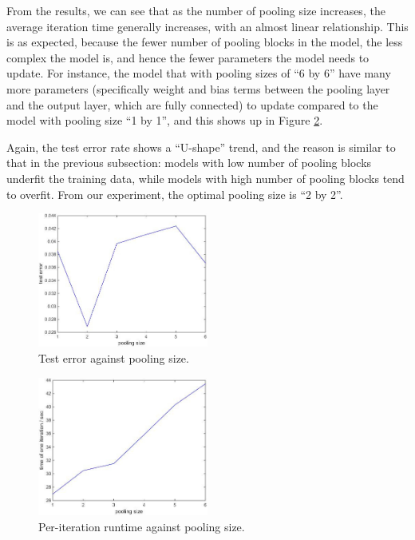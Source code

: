 \documentclass[10pt,twocolumn]{article}
\begin{document}
From the results, we can see that as the number of pooling size increases, the average iteration time generally increases, with an almost linear relationship. This is as expected, because the fewer number of pooling blocks in the model, the less complex the model is, and hence the fewer parameters the model needs to update. For instance, the model that with pooling sizes of ``6 by 6'' have many more parameters (specifically weight and bias terms between the pooling layer and the output layer, which are fully connected) to update compared to the model with pooling size ``1 by 1'', and this shows up in Figure \ref{fig:iter_time_vs_pooling_size}.

Again, the test error rate shows a ``U-shape'' trend, and the reason is similar to that in the previous subsection: models with low number of pooling blocks underfit the training data, while models with high number of pooling blocks tend to overfit. From our experiment, the optimal pooling size is ``2 by 2''.

\begin{figure}
\includegraphics[width = 0.5\textwidth]{figure/test_error_vs_pooling_size}
\caption{Test error against pooling size.}
\label{fig:test_error_vs_pooling_size}
\end{figure}

\begin{figure}
\includegraphics[width = 0.5\textwidth]{figure/iter_time_vs_pooling_size}
\caption{Per-iteration runtime against pooling size.}
\label{fig:iter_time_vs_pooling_size}
\end{figure}
\end{document}
